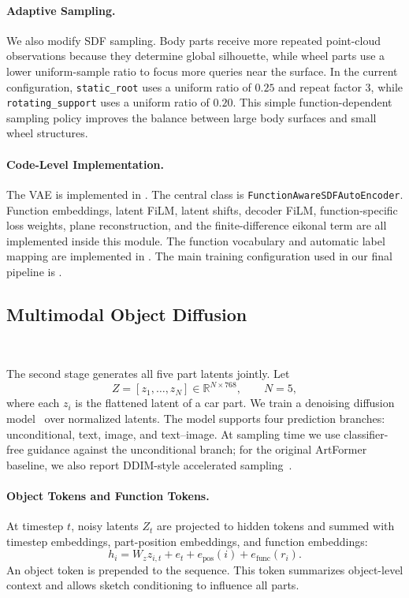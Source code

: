 \documentclass[10pt]{article}
\newcommand{\artformer}{ArtFormer\xspace}
\begin{document}
\paragraph{Adaptive Sampling.}
We also modify SDF sampling. Body parts receive more repeated point-cloud observations because they determine global silhouette, while wheel parts use a lower uniform-sample ratio to focus more queries near the surface. In the current configuration, \texttt{static\_root} uses a uniform ratio of $0.25$ and repeat factor $3$, while \texttt{rotating\_support} uses a uniform ratio of $0.20$. This simple function-dependent sampling policy improves the balance between large body surfaces and small wheel structures.

\paragraph{Code-Level Implementation.}
The VAE is implemented in . The central class is \texttt{FunctionAwareSDFAutoEncoder}. Function embeddings, latent FiLM, latent shifts, decoder FiLM, function-specific loss weights, plane reconstruction, and the finite-difference eikonal term are all implemented inside this module. The function vocabulary and automatic label mapping are implemented in . The main training configuration used in our final pipeline is .

\subsection{Multimodal Object Diffusion}

\ 

The second stage generates all five part latents jointly. Let
\begin{equation}
    Z = [z_1,\ldots,z_N] \in \mathbb{R}^{N \times 768}, \qquad N=5,
\end{equation}
where each $z_i$ is the flattened latent of a car part. We train a denoising diffusion model~\cite{ho2020ddpm} over normalized latents. The model supports four prediction branches: unconditional, text, image, and text--image. At sampling time we use classifier-free guidance against the unconditional branch; for the original \artformer baseline, we also report DDIM-style accelerated sampling~\cite{song2020ddim}.

\paragraph{Object Tokens and Function Tokens.}
At timestep $t$, noisy latents $Z_t$ are projected to hidden tokens and summed with timestep embeddings, part-position embeddings, and function embeddings:
\begin{equation}
    h_i = W_z z_{i,t} + e_t + e_{\mathrm{pos}}(i) + e_{\mathrm{func}}(r_i).
\end{equation}
An object token is prepended to the sequence. This token summarizes object-level context and allows sketch conditioning to influence all parts.
\end{document}

